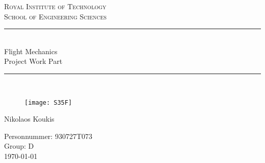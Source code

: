 \newcommand{\horrule}[1]{\rule{\linewidth}{#1}} %

\begin{titlepage}

\begin{center}
\normalfont \normalsize 
\textsc{Royal Institute of Technology} \\  %
\textsc{School of Engineering Sciences} \\ [25pt] %
\horrule{0.5pt} \\[0.4cm] %
\huge Flight Mechanics \vspace{5mm}\\ Project Work Part \\ %
\horrule{2pt} \\[0.5cm] %
\vspace*{10mm}

\begin{figure}[H]
    \centering
    \texttt{[image: S35F]}
\end{figure}

\LARGE 
Nikolaos Koukis

\vfill
\normalsize \normalfont
Personnummer: 930727T073\\
Group: D\\
\today
\end{center}
\end{titlepage}
